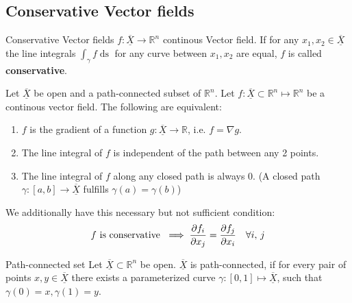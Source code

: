 \documentclass[a4paper,fontsize = 10pt]{article}
\def\R{\mathbb{R}}
\def\X{\underline{\overline{X}}}
\begin{document}
\subsection{Conservative Vector fields}
\begin{subbox}{Conservative Vector fields}
    $f: \X \to \R^n$ continous Vector field. If for any $x_1, x_2 \in \X$ the line integrals $\int_{\gamma}f \mathop{ds}$ for any curve between $x_1,x_2$ are equal, $f$ is called \textbf{conservative}.
\end{subbox}

Let \(\X\) be open and a path-connected subset of $\R^n$. Let \(f: \X \subset \R^n \mapsto \R^n\) be a continous vector field. The following are equivalent:
\begin{enumerate}
  \item $f$ is the gradient of a function $g: \X \to \R$, i.e. $f = \nabla g$.
  \item The line integral of $f$ is independent of the path between any 2 points.
  \item The line integral of $f$ along any closed path is always $0$. (A closed path $\gamma: [a, b] \to \X$ fulfills $\gamma(a) =\gamma(b)$)
\end{enumerate}
We additionally have this necessary but not sufficient condition:
\[f \text{ is conservative }\implies \pdv{f_i}{x_j} = \pdv{f_j}{x_i} \quad \forall i,\, j\]

\begin{subbox}{Path-connected set}
  Let \(\X \subset \R^n\) be open. \(\X\) is path-connected, if for every pair of points \(x, y \in \X\) there exists a parameterized curve \(\gamma : \left[0, 1\right] \mapsto \X\), such that \(\gamma(0) = x, \gamma(1) = y\).
\end{subbox}
\end{document}
